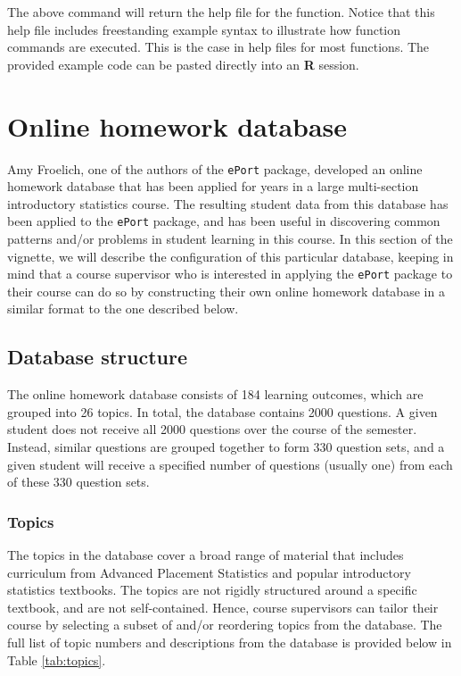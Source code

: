\documentclass{article}\usepackage[]{graphicx}\usepackage[]{color}
\numberwithin{equation}{section} %
\begin{document}
The above command will return the help file for the function. Notice that this help file includes freestanding example syntax to illustrate how function commands are executed. This is the case in help files for most functions. The provided example code can be pasted directly into an \textbf{\textsf{R}} session.

\section{Online homework database}
\label{sec:OnlineHomework}

Amy Froelich, one of the authors of the \texttt{ePort} package, developed an online homework database that has been applied for years in a large multi-section introductory statistics course. The resulting student data from this database has been applied to the \texttt{ePort} package, and has been useful in discovering common patterns and/or problems in student learning in this course. In this section of the vignette, we will describe the configuration of this particular database, keeping in mind that a course supervisor who is interested in applying the \texttt{ePort} package to their course can do so by constructing their own online homework database in a similar format to the one described below.

\subsection{Database structure}

The online homework database consists of 184 learning outcomes, which are grouped into 26 topics. In total, the database contains 2000 questions. A given student does not receive all 2000 questions over the course of the semester. Instead, similar questions are grouped together to form 330 question sets, and a given student will receive a specified number of questions (usually one) from each of these 330 question sets.

\subsubsection{Topics}

The topics in the database cover a broad range of material that includes curriculum from Advanced Placement Statistics and popular introductory statistics textbooks. The topics are not rigidly structured around a specific textbook, and are not self-contained. Hence, course supervisors can tailor their course by selecting a subset of and/or reordering topics from the database. The full list of topic numbers and descriptions from the database is provided below in Table \ref{tab:topics}.
\end{document}
